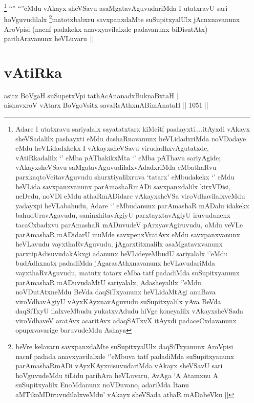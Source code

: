 \begin{artha}
\footnote{Adare I utatxravu sariyalalx sayatatxtarx kiMcitf pashayxti....itAyxdi vAkayx sheVSadalilx pashayxti eMdu dashaRnavanunx heVLidadxriMda noVDadaye eMdu heVLidadxkekx I vAkayxsheVSavu virudadhxvAgutatxde, vAtiRkadalilx `\stext' eMba pAThakikxMta `\stext' eMba pAThavu sariyAgide; vAkayxsheVSavu saMgatavAguvudilalxvAdadxriMda eMbathaRvu parxkaqtoVcitavAguvudu shurxtiyalilxruva `tatarx' eMbudakekx `\stext' eMdu heVLida savxpanxvanunx parAmashaRmADi savxpanxdalilx kirxVDisi, neDedu, noVDi eMdu athaRmADidare vAkayxsheVSa viroVdhavilalxveMdu yadayxpi heVLabahudu, Adare `\stext' eMbudanunx parAmashaR mADalu idakekx bahudUravAgavudu, saninxhitavAgiyU parxtayxtavAgiyU iruvudanenx tacaCxbadxvu parAmashaR mADuvudeV pArxyavAgiruvudu, oMdu veVLe parAmashaR mADidarU muMde savxpenxVratAvx eMdu savxpanxvanunx heVLavudu vayxthaRvAguvudu, jAgarxtitxnalilx asaMgatavxvanunx parxtipAdisuvudakAkxgi adanunx heVLideyeMbudU sariyalalx `\stext'eMdu budAdhxnatx padadiMda jAgarasAthxnavanunx heVLavudariMda vayxthaRvAguvudu, matutx tatarx eMba tatf padadiMda suSupitxyanunx parAmashaR mADuvudaMtU sariyalalx, Adasheyalilx `\stext'eMdu noVDutAtxneMdu BeVda daqSiTxyanunx heVLidaMtAgi anuBava viroVdhavAgiyU vAyxKAyxnavAguvudu suSupitxyalilx yAva BeVda daqSiTxyU ilalxveMbudu yukatxvAdudu hiVge koneyalilx vAkayxsheVSada viroVdhaveV aratAvx acaritAvx adaqSATxvX itAyxdi padaceCxdavanunx opupxvavarige baruvudeMdu Ashaya}
``\stext'' ``\stext''eMdu vAkayx sheVSavu asaMgatavAguvudariMda I utatxravU sari hoVguvudilalx \footnote{beVre kelavaru savxpanxdaMte suSupitxyalUlx daqSiTxyanunx AroVpisi nacnf padada anavxyavilalxde `\stext'eMbuva tatf padadiMda suSupitxyanunx parAmashaRmADi vAyxKAyxnisuvudariMda vAkayx sheVSavU sari hoVguvudeMdu tiLidu parihAra heVLuvaru, AvAga `A Atamxnu A suSupitxyalilx EnoMdanunx noVDuvano, adariMda Itanu aMTikoMDiruvudilalxveMdu' vAkayx sheVSada athaR mADabeVku ||}matotxbabxru savxpanxdaMte suSupitxyalUlx jAcnxnavanunx AroVpisi (nacnf padakekx anavxyavilalxde padavanunx biDisutAtx) parihAravanunx heVLuvaru ||
\end{artha}

\section*{vAtiRka}


\begin{shl}
asitx BoVgaH suSupetxV\s pi tathAcA\s \s nanadxBuknaBxtaH | \\
aishavxroV vA\s tarx BoVgoV\s sitx savaRsAthxnABimAnataH \hfill||  1051 ||  
\end{shl}

